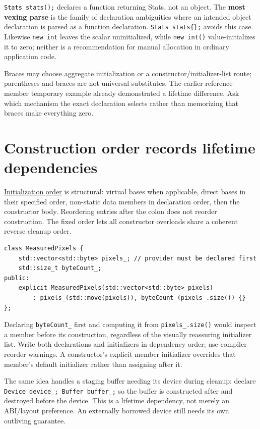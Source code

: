 \texttt{Stats\ stats();} declares a function returning Stats, not an object. The \textbf{most vexing parse} is the family of declaration ambiguities where an intended object declaration is parsed as a function declaration. \texttt{Stats\ stats\{\};} avoids this case. Likewise \texttt{new\ int} leaves the scalar uninitialized, while \texttt{new\ int()} value-initializes it to zero; neither is a recommendation for manual allocation in ordinary application code.

Braces may choose aggregate initialization or a constructor/initializer-list route; parentheses and braces are not universal substitutes. The earlier reference-member temporary example already demonstrated a lifetime difference. Ask which mechanism the exact declaration selects rather than memorizing that braces make everything zero.

\section{Construction order records lifetime dependencies}\label{01-foundations-i-ch003-construction-order-records-lifetime-dependencies}

\hyperref[appendix-3cb49709605a]{Initialization order} is structural: virtual bases when applicable, direct bases in their specified order, non-static data members in declaration order, then the constructor body. Reordering entries after the colon does not reorder construction. The fixed order lets all constructor overloads share a coherent reverse cleanup order.

\begin{verbatim}
class MeasuredPixels {
    std::vector<std::byte> pixels_; // provider must be declared first
    std::size_t byteCount_;
public:
    explicit MeasuredPixels(std::vector<std::byte> pixels)
        : pixels_(std::move(pixels)), byteCount_(pixels_.size()) {}
};
\end{verbatim}

Declaring \texttt{byteCount\_} first and computing it from \texttt{pixels\_.size()} would inspect a member before its construction, regardless of the visually reassuring initializer list. Write both declarations and initializers in dependency order; use compiler reorder warnings. A constructor's explicit member initializer overrides that member's default initializer rather than assigning after it.

The same idea handles a staging buffer needing its device during cleanup: declare \texttt{Device\ device\_;\ Buffer\ buffer\_;} so the buffer is constructed after and destroyed before the device. This is a lifetime dependency, not merely an ABI/layout preference. An externally borrowed device still needs its own outliving guarantee.

